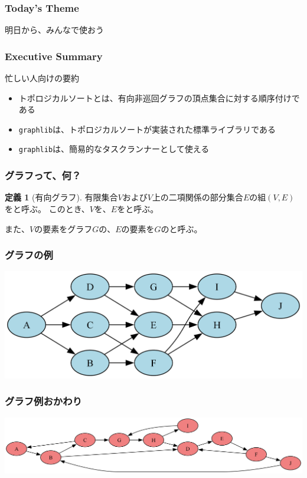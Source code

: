 \documentclass[aspectratio=169,dvipdfmx,12pt,notheorems]{beamer}
\theoremstyle{definition}
\newtheorem{definition}{定義}
\begin{document}
\begin{frame}\frametitle{Today's Theme}

\begin{center}
\Huge{明日から、みんなで使おう}
\end{center}

\end{frame}

\begin{frame}\frametitle{Executive Summary}

\begin{block}{忙しい人向けの要約}
\begin{itemize}
\item トポロジカルソートとは、有向非巡回グラフの頂点集合に対する順序付けである
\item \texttt{graphlib}は、トポロジカルソートが実装された標準ライブラリである
\item \texttt{graphlib}は、簡易的なタスクランナーとして使える
\end{itemize}
\end{block}

\end{frame}

\begin{frame}\frametitle{グラフって、何？}

\begin{definition}[有向グラフ]
有限集合$V$および$V$上の二項関係の部分集合$E$の組$(V, E)$をと呼ぶ。
このとき、$V$を、$E$をと呼ぶ。

また、$V$の要素をグラフ$G$の、$E$の要素を$G$のと呼ぶ。
\end{definition}

\end{frame}

\begin{frame}\frametitle{グラフの例}

\begin{center}
\includegraphics[width=15cm]{dag_example.png}
\end{center}

\end{frame}

\begin{frame}\frametitle{グラフ例おかわり}

\begin{center}
\includegraphics[width=15cm]{non_dag_example.png}
\end{center}

\end{frame}
\end{document}
